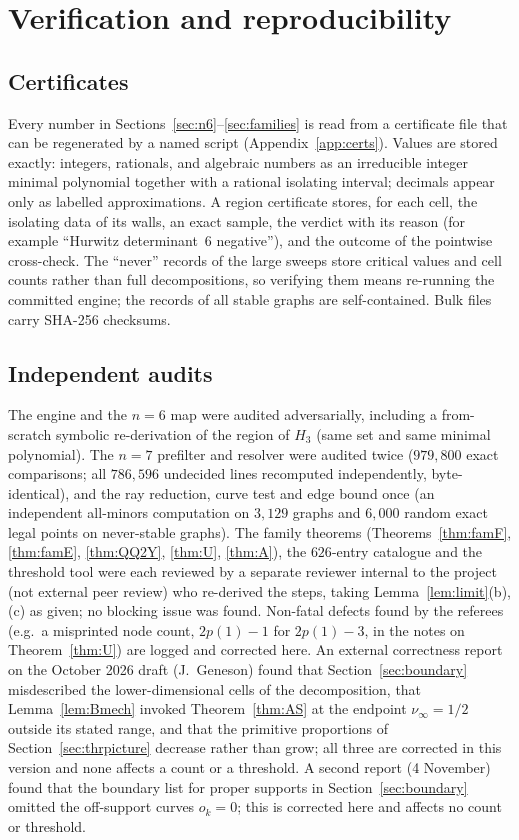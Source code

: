 \documentclass[11pt]{article}
\theoremstyle{definition}
\begin{document}
{%
\section{Verification and reproducibility}\label{sec:verification}

\subsection{Certificates}
Every number in Sections~\ref{sec:n6}--\ref{sec:families} is read from a certificate file that can be regenerated by a named
script (Appendix~\ref{app:certs}). Values are stored exactly: integers, rationals, and algebraic numbers as an irreducible
integer minimal polynomial together with a rational isolating interval; decimals appear only as labelled approximations. A
region certificate stores, for each cell, the isolating data of its walls, an exact sample, the verdict with its reason (for
example ``Hurwitz determinant~6 negative''), and the outcome of the pointwise cross-check. The ``never'' records of the large
sweeps store critical values and cell counts rather than full decompositions, so verifying them means re-running the committed
engine; the records of all stable graphs are self-contained. Bulk files carry SHA-256 checksums.

\subsection{Independent audits}
The engine and the $n=6$ map were audited adversarially, including a from-scratch symbolic re-derivation of the region of $H_3$
(same set and same minimal polynomial). The $n=7$ prefilter and resolver were audited twice ($979{,}800$ exact comparisons; all
$786{,}596$ undecided lines recomputed independently, byte-identical), and the ray reduction, curve test and edge bound once (an
independent all-minors computation on $3{,}129$ graphs and $6{,}000$ random exact legal points on never-stable graphs). The family
theorems (Theorems~\ref{thm:famF}, \ref{thm:famE}, \ref{thm:QQ2Y}, \ref{thm:U}, \ref{thm:A}), the $626$-entry catalogue and the
threshold tool were each reviewed by a separate reviewer internal to the project (not external peer review) who re-derived the steps, taking Lemma~\ref{lem:limit}(b),(c) as given; no blocking
issue was found. Non-fatal defects found
by the referees (e.g.\ a misprinted node count, $2p(1)-1$ for $2p(1)-3$, in the notes on Theorem~\ref{thm:U}) are logged and
corrected here. An external correctness report on the October 2026 draft (J.~Geneson) found that Section~\ref{sec:boundary} misdescribed the
lower-dimensional cells of the decomposition, that Lemma~\ref{lem:Bmech} invoked Theorem~\ref{thm:AS} at the endpoint
$\nu_\infty=1/2$ outside its stated range, and that the primitive proportions of Section~\ref{sec:thrpicture} decrease rather than grow; all
three are corrected in this version and none affects a count or a threshold. A second report (4 November) found that the boundary list
for proper supports in Section~\ref{sec:boundary} omitted the off-support curves $o_k=0$; this is corrected here and affects no count or threshold.

}
\end{document}

